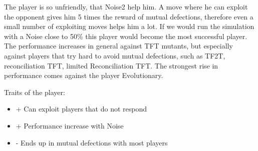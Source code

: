 \documentclass[11pt,twoside]{article}
\begin{document}
The player is so unfriendly, that Noise2 help him. A move where he can exploit the opponent gives him 5 times the reward of mutual defections, therefore even a small number of exploiting moves helps him a lot. If we would run the simulation with a Noise close to 50\% this player would become the most successful player. The performance increases in general against TFT mutants, but especially against players that try hard to avoid mutual defections, such as TF2T, reconciliation TFT, limited Reconciliation TFT. The strongest rise in performance comes against the player Evolutionary. 

Traits of the player:

\renewcommand{\labelitemi}{}

\begin{itemize}
	\item + Can exploit players that do not respond
	\item + Performance increase with Noise
	\item - Ends up in mutual defections with most players

\end{itemize}
\renewcommand{\labelitemi}{$\bullet$}

\newpage
\end{document}
